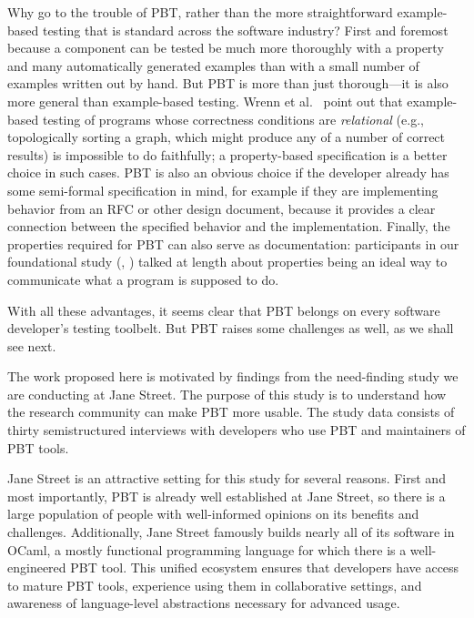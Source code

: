 \smallskip

Why go to the trouble of PBT, rather than the more straightforward
example-based testing that is standard across the software industry?
First and foremost because a component can be tested be much more
thoroughly with a property and many automatically generated examples
than with a small number of examples written out by hand.
But
PBT is more than just thorough---it is also more general than example-based
testing. Wrenn et al.~\cite{wrenn2021using} point out that example-based testing
of programs whose correctness conditions are {\em relational} (e.g.,
topologically sorting a graph, which might
produce any of a number of correct results) is impossible to do
faithfully; a property-based specification is a better choice in
such cases.
PBT is also
an obvious choice if
the developer already has some semi-formal
specification in mind, for example if they are implementing behavior from an RFC or
other design document, because it provides a clear connection between the
specified behavior and the implementation.
Finally, the
properties required for PBT can also serve as documentation:
participants in our foundational study (, )
talked at length about properties being an ideal way to communicate what a
program is supposed to do.

With all these advantages, it seems clear that PBT belongs on every
software developer's testing toolbelt.  But PBT raises some challenges
as well, as we shall see next.

%
The work proposed here is motivated by findings from the
need-finding study we are conducting at Jane Street. The purpose of this
study is to understand how the research community can make PBT more
usable. The study data consists of thirty semistructured interviews
with developers who use PBT and maintainers of PBT tools.

Jane Street is
an attractive setting for this study for several reasons.  First and most
importantly, PBT is
already well established at Jane Street, so there is a large
population of people with well-informed opinions on its benefits and
challenges. Additionally, Jane Street famously builds nearly all of its
software in OCaml, a mostly functional programming language for which
there is a well-engineered PBT tool. This unified
ecosystem ensures that developers have access to mature PBT tools,
experience using them in collaborative settings,
and awareness of language-level abstractions necessary
for advanced usage.

